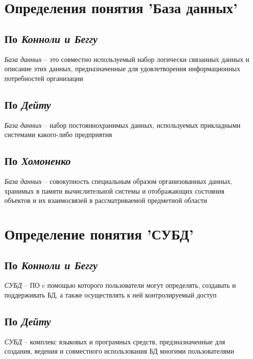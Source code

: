 \documentclass[12pt, a4paper]{article}
\begin{document}
\section{Определения понятия 'База данных'}

\subsection{По \emph{Конноли и Беггу}}

\emph{База данных} -- это совместно используемый набор логически связанных данных и описание этих данных, предназначенные для удовлетворения информационных потребностей организации

\subsection{По \emph{Дейту}} 
\emph{База данных} -- набор постояннохранимых данных, используемых прикладными системами какого-либо предприятия

\subsection{По \emph{Хомоненко}}

\emph{База данных} -- совокупность специальным образом организованных данных, хранимых в памяти вычислительной системы и отображающих состояния объектов и их взаимосвязей в рассматриваемой предметной области

\section{Определение понятия 'СУБД'}

\subsection{По \emph{Конноли и Беггу}}

\emph{СУБД} -- ПО c помощью которого пользователи могут определять, создавать и поддерживать БД, а также осуществлять к ней контролируемый доступ

\subsection{По \emph{Дейту}} 

\emph{СУБД} -- комплекс языковых и програмных средств, предзназначенные для создания, ведения и совместного использования БД многими пользователями
\end{document}
